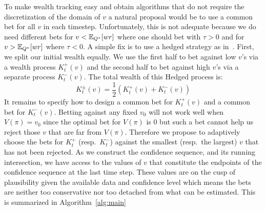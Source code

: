 To make wealth tracking easy and
obtain algorithms that do not require the 
discretization of the domain of $v$ a natural
proposal would be to use a common bet for 
all $v$ in each timestep. Unfortunately, 
this is not adequate because we do need 
different bets for $v<\mathbb{E}_{Q^*}[wr]$ where
one should bet with $\tau > 0$ and for 
$v>\mathbb{E}_{Q^*}[wr]$ where $\tau < 0$. 
A simple fix is to use a hedged 
strategy as in~\cite{waudby-smith_variance-adaptive_2020}.
First, we split our initial wealth equally.
We use the first half to bet against low $v$'s
via a wealth process $K_t^+(v)$
and the second half to bet against high $v$'s
via a separate process $K_t^-(v)$.
The total wealth of this Hedged process is:
\begin{equation}
K_t^\pm(v) = \frac{1}{2} (K_t^+(v) + K_t^-(v))
\label{eq:hedged}
\end{equation}
It remains to specify how to design a common bet
for $K_t^+(v)$ and a common bet for $K_t^-(v)$.
Betting against any fixed $v_0$ 
will not work well when $V(\pi)=v_0$
since the optimal bet for $V(\pi)$ is 0 but
such a bet cannot help us reject those $v$ that are far from
$V(\pi)$. Therefore we propose to adaptively choose
the bets for $K_t^+$ (resp.\ $K_t^-$) against the 
smallest (resp.\ the largest) $v$ 
that has not been rejected. As we 
construct the confidence sequence, and its running 
intersection, we have access to the values of $v$
that constitute the endpoints of the confidence sequence
at the last time step. These values are on the cusp of
plausibility given the available data and confidence level
which means the bets are neither too conservative nor 
too detached from what can be estimated.
This is summarized in Algorithm~\ref{alg:main}

